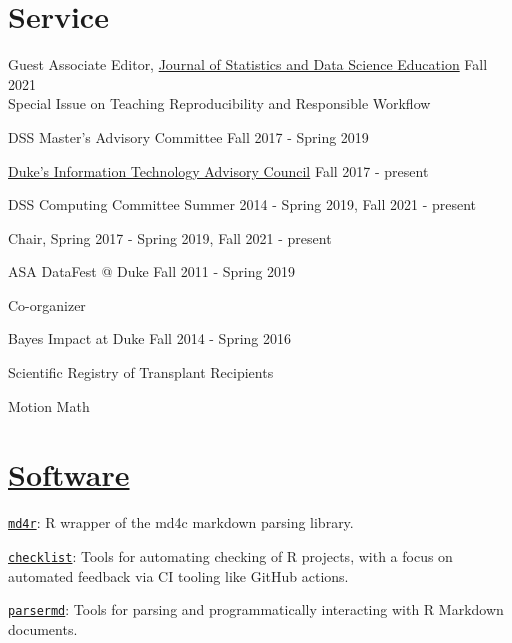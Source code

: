 \documentclass[margin,line]{res}
\begin{document}
\begin{resume}
\vspace{4mm}

\section{\sc Service}

Guest Associate Editor, \href{https://www.tandfonline.com/action/journalInformation?show=aimsScope&journalCode=ujse20}{Journal of Statistics and Data Science Education} \hfill Fall 2021\\
Special Issue on Teaching Reproducibility and Responsible Workflow

DSS Master's Advisory Committee \hfill Fall 2017 - Spring 2019

\href{http://services.duke.edu/itac/}{Duke's Information Technology Advisory Council} \hfill Fall 2017 - present

DSS Computing Committee \hfill Summer 2014 - Spring 2019, Fall 2021 - present
\begin{list1}
\item[] Chair, Spring 2017 - Spring 2019, Fall 2021 - present              
\end{list1}

ASA DataFest @ Duke \hfill Fall 2011 - Spring 2019
\begin{list1}
\item[] Co-organizer
\end{list1}


Bayes Impact at Duke \hfill Fall 2014 - Spring 2016
\begin{list1}
\item[] Scientific Registry of Transplant Recipients
\item[] Motion Math
\end{list1}


\vspace{4mm}

\section{\sc \href{https://github.com/rundel/}{Software}}

\href{https://github.com/rundel/md4r}{\texttt{md4r}}: R wrapper of the md4c markdown parsing library.

\href{https://github.com/rundel/checklist}{\texttt{checklist}}: Tools for automating checking of R projects, with a focus on automated feedback via CI tooling like GitHub actions.

\href{https://github.com/rundel/parsermd}{\texttt{parsermd}}: Tools for parsing and programmatically interacting with R Markdown documents.


\end{resume}
\end{document}
